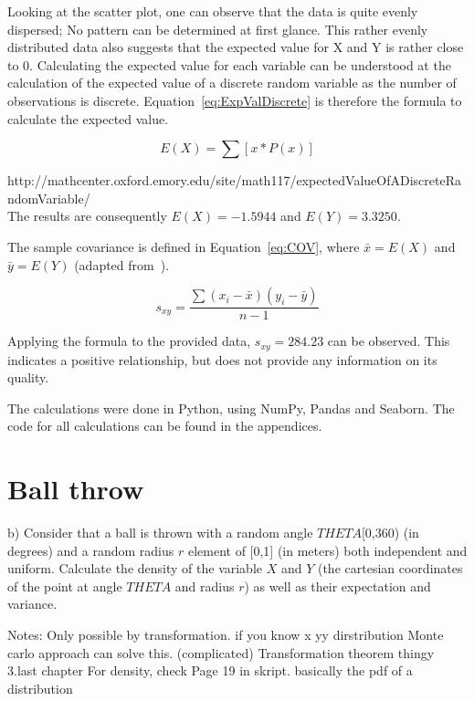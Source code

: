 Looking at the scatter plot, one can observe that the data is quite evenly dispersed; No pattern can be determined at first glance. This rather evenly distributed data also suggests that the expected value for X and Y is rather close to 0. Calculating the expected value for each variable can be understood at the calculation of the expected value of a discrete random variable as the number of observations is discrete. Equation~\ref{eq:ExpValDiscrete} is therefore the formula to calculate the expected value. 


\begin{equation}  E(X) = \sum [x * P(x)]
\label{eq:ExpValDiscrete}
\end{equation}

http://mathcenter.oxford.emory.edu/site/math117/expectedValueOfADiscreteRandomVariable/
\\

The results are consequently $E(X) = -1.5944$ and $E(Y) = 3.3250$.

The sample covariance is defined in Equation~\ref{eq:COV}, where $\bar{x} = E(X)$ and $\bar{y} = E(Y)$ (adapted from~\cite{bruce2017practical}).

\begin{equation}  s_{xy} = \frac{\sum(x_{i}-\bar{x})(y_{i}-\bar{y})}{n-1}
\label{eq:COV}
\end{equation}

Applying the formula to the provided data, $s_{xy} = 284.23$ can be observed. This indicates a positive relationship, but does not provide any information on its quality. 

The calculations were done in Python, using NumPy, Pandas and Seaborn. The code for all calculations can be found in the appendices. 

\section{Ball throw}
b) Consider that a ball is thrown with a random angle $THETA$[0,360) (in degrees) and a random radius $r$ element of [0,1] (in meters) both independent and uniform. Calculate the density of the variable $X$ and $Y$ (the cartesian coordinates of the point at angle $THETA$ and radius $r$) as well as their expectation and variance.

Notes:
Only possible by transformation. if you know x yy dirstribution 
Monte carlo approach can solve this. (complicated)
Transformation theorem thingy 3.last chapter
For density, check Page 19 in skript. basically the pdf of a distribution




